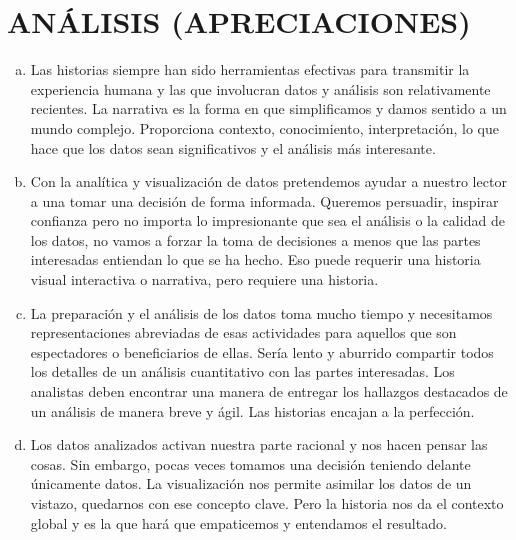\documentclass[preprint,12pt]{elsarticle}
\begin{document}
	\section{ANÁLISIS (APRECIACIONES)}
	\begin{enumerate}[a)]
		\item Las historias siempre han sido herramientas efectivas para transmitir la experiencia humana y las que involucran datos y análisis son relativamente recientes. La narrativa es la forma en que simplificamos y damos sentido a un mundo complejo. Proporciona contexto, conocimiento, interpretación, lo que hace que los datos sean significativos y el análisis más interesante.\\
		
		\item Con la analítica y visualización de datos pretendemos ayudar a nuestro lector a una tomar una decisión de forma informada. Queremos persuadir, inspirar confianza pero no importa lo impresionante que sea el análisis o la calidad de los datos, no vamos  a forzar la toma de decisiones a menos que las partes interesadas entiendan lo que se  ha hecho. Eso puede requerir una historia visual interactiva o narrativa, pero requiere una historia.\\
		
		
		\item La preparación y el análisis de los datos toma mucho tiempo y necesitamos representaciones abreviadas de esas actividades para aquellos que son espectadores o beneficiarios de ellas. Sería lento y aburrido compartir todos los detalles de un análisis cuantitativo con las partes interesadas. Los analistas deben encontrar una manera de entregar los hallazgos destacados de un análisis de manera breve y ágil. Las historias encajan a la perfección.\\
		
		\item Los datos analizados activan nuestra parte racional y nos hacen pensar las cosas. Sin embargo, pocas veces tomamos una decisión teniendo delante únicamente datos. La visualización nos permite asimilar los datos de un vistazo, quedarnos con ese concepto clave. Pero la historia nos da el contexto global y es la que hará que empaticemos y entendamos el resultado. 
		
	\end{enumerate}


	
	
	
	
	
\end{document}
